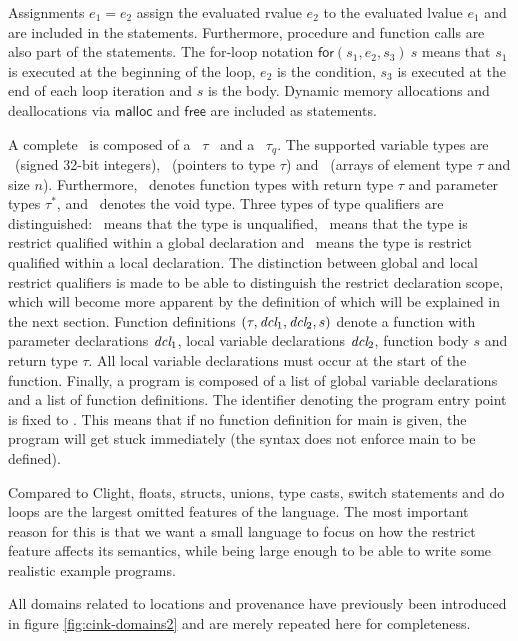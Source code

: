 Assignments $e_1 = e_2$ assign the evaluated rvalue $e_2$ to the evaluated lvalue $e_1$ and are included in the statements.
Furthermore, procedure and function calls are also part of the statements.
The for-loop notation $\mathsf{for}(s_1, e_2, s_3) \ s$ means that $s_1$ is executed at the beginning of the loop,
$e_2$ is the condition, $s_3$ is executed at the end of each loop iteration and $s$ is the body.
Dynamic memory allocations and deallocations via $\mathsf{malloc}$ and $\mathsf{free}$ are included as statements.

A complete \Type \ is composed of a \Simpletype \ $\tau$ \ and a \Typequalifier \ $\tau_q$.
The supported variable types are \Inttype \ (signed 32-bit integers), \Ptrtype \ (pointers to type $\tau$) and \Arraytype \ (arrays of element type $\tau$ and size $n$).
Furthermore, \Functiontype \ denotes function types with return type $\tau$ and parameter types $\tau^*$, and \Voidtype \ denotes the void type.
Three types of type qualifiers are distinguished: \Noqualifier \ means that the type is unqualified,
\Globalrestrictqualifier \ means that the type is restrict qualified within a global declaration
and \Restrictqualifier \ means the type is restrict qualified within a local declaration.
The distinction between global and local restrict qualifiers is made to be able to distinguish the restrict declaration scope,
which will become more apparent by the definition of  which will be explained in the next section.
Function definitions $(\tau, \textit{dcl}_1, \textit{dcl}_2, s)$ denote a function with
parameter declarations $\textit{dcl}_1$, local variable declarations $\textit{dcl}_2$, function body $s$ 
and return type $\tau$.
All local variable declarations must occur at the start of the function.
Finally, a program is composed of a list of global variable declarations and a list of function definitions.
The identifier denoting the program entry point is fixed to .
This means that if no function definition for main is given, the program will get stuck immediately (\ie the syntax does not enforce main to be defined).

Compared to Clight, floats, structs, unions, type casts, switch statements and do loops are the largest omitted features of the language.
The most important reason for this is that we want a small language to focus on how the restrict feature affects its semantics,
while being large enough to be able to write some realistic example programs. 

All domains related to locations and provenance have previously been introduced
in figure \ref{fig:cink-domains2} and are merely repeated here for completeness.

